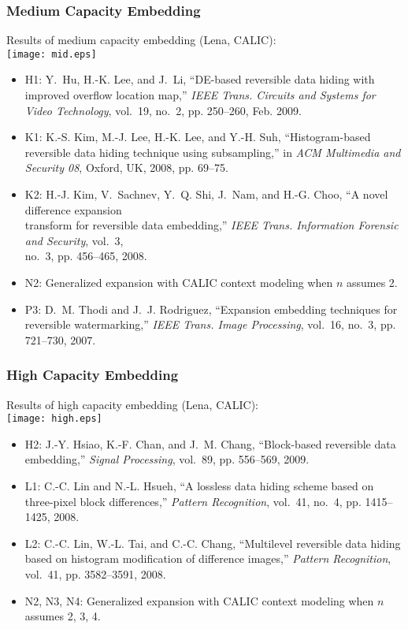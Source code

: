 \documentclass[slidestop,compress]{beamer}
\begin{document}
\begin{frame}
\frametitle{Medium Capacity Embedding}
    Results of medium capacity embedding (Lena, CALIC): \\
    \centering
    \texttt{[image: mid.eps]}
    \tiny{
    \begin{itemize}
	\item H1: Y.~Hu, H.-K. Lee, and J.~Li, ``\uppercase{DE}-based reversible data hiding with
	    improved overflow location map,'' \emph{IEEE Trans. Circuits and Systems for Video
	    Technology}, vol.~19, no.~2, pp. 250--260, Feb. 2009.
	\item K1: K.-S. Kim, M.-J. Lee, H.-K. Lee, and Y.-H. Suh, ``Histogram-based reversible data
	    hiding technique using subsampling,'' in \emph{ACM Multimedia and Security 08}, Oxford,
	    UK, 2008, pp. 69--75.
	\item K2: H.-J. Kim, V.~Sachnev, Y.~Q. Shi, J.~Nam, and H.-G. Choo, ``A novel difference
	    expansion \\ transform for reversible data embedding,'' \emph{IEEE Trans. Information
	    Forensic and Security}, vol.~3, \\ no.~3, pp. 456--465, 2008.
	\item N2: Generalized expansion with CALIC context modeling when $n$ assumes 2.
	\item P3: D.~M. Thodi and J.~J. Rodriguez, ``Expansion embedding techniques for reversible
	    watermarking,'' \emph{IEEE Trans. Image Processing}, vol.~16, no.~3, pp. 721--730, 2007.
    \end{itemize}
    }
\end{frame}

\begin{frame}
\frametitle{High Capacity Embedding}
    Results of high capacity embedding (Lena, CALIC): \\
    \centering
    \texttt{[image: high.eps]}
    \tiny{
    \begin{itemize}
	\item H2: J.-Y. Hsiao, K.-F. Chan, and J.~M. Chang, ``Block-based reversible data
	    embedding,'' \emph{Signal Processing}, vol.~89, pp. 556--569, 2009.
	\item L1: C.-C. Lin and N.-L. Hsueh, ``A lossless data hiding scheme based on three-pixel
	    block differences,'' \emph{Pattern Recognition}, vol.~41, no.~4, pp.  1415--1425, 2008.
	\item L2: C.-C. Lin, W.-L. Tai, and C.-C. Chang, ``Multilevel reversible data hiding based on
	    histogram modification of difference images,'' \emph{Pattern Recognition}, vol.~41, pp.
	    3582--3591, 2008.
	\item N2, N3, N4: Generalized expansion with CALIC context modeling when $n$ assumes 2, 3,
	    4.
    \end{itemize}
    }
\end{frame}
\end{document}

